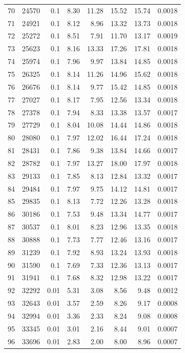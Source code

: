 \documentclass[11pt,a4paper]{article}
\begin{document}
\begin{center}
\begin{longtable}{@{}rrrrrrrr@{}}
70 & 24570 & 0.1 & 8.30 & 11.28 & 15.52 & 15.74 & 0.0018 \\
71 & 24921 & 0.1 & 8.12 & 8.96 & 13.32 & 13.73 & 0.0018 \\
72 & 25272 & 0.1 & 8.51 & 7.91 & 11.70 & 13.17 & 0.0019 \\
73 & 25623 & 0.1 & 8.16 & 13.33 & 17.26 & 17.81 & 0.0018 \\
74 & 25974 & 0.1 & 7.96 & 9.97 & 13.84 & 14.85 & 0.0018 \\
75 & 26325 & 0.1 & 8.14 & 11.26 & 14.96 & 15.62 & 0.0018 \\
76 & 26676 & 0.1 & 8.14 & 9.77 & 15.42 & 14.85 & 0.0018 \\
77 & 27027 & 0.1 & 8.17 & 7.95 & 12.56 & 13.34 & 0.0018 \\
78 & 27378 & 0.1 & 7.94 & 8.33 & 13.38 & 13.57 & 0.0017 \\
79 & 27729 & 0.1 & 8.04 & 10.08 & 14.44 & 14.86 & 0.0018 \\
80 & 28080 & 0.1 & 7.97 & 12.02 & 16.44 & 17.24 & 0.0018 \\
81 & 28431 & 0.1 & 7.86 & 9.38 & 13.84 & 14.66 & 0.0017 \\
82 & 28782 & 0.1 & 7.97 & 13.27 & 18.00 & 17.97 & 0.0018 \\
83 & 29133 & 0.1 & 7.85 & 8.13 & 12.84 & 13.32 & 0.0017 \\
84 & 29484 & 0.1 & 7.97 & 9.75 & 14.12 & 14.81 & 0.0017 \\
85 & 29835 & 0.1 & 8.13 & 7.72 & 12.26 & 13.28 & 0.0018 \\
86 & 30186 & 0.1 & 7.53 & 9.48 & 13.34 & 14.77 & 0.0017 \\
87 & 30537 & 0.1 & 8.01 & 8.23 & 12.96 & 13.35 & 0.0018 \\
88 & 30888 & 0.1 & 7.73 & 7.77 & 12.46 & 13.16 & 0.0017 \\
89 & 31239 & 0.1 & 7.92 & 8.93 & 13.24 & 13.93 & 0.0018 \\
90 & 31590 & 0.1 & 7.69 & 7.33 & 12.36 & 13.13 & 0.0017 \\
91 & 31941 & 0.1 & 7.68 & 8.32 & 12.98 & 13.22 & 0.0017 \\
92 & 32292 & 0.01 & 5.31 & 3.08 & 8.56 & 9.48 & 0.0012 \\
93 & 32643 & 0.01 & 3.57 & 2.59 & 8.26 & 9.17 & 0.0008 \\
94 & 32994 & 0.01 & 3.36 & 2.33 & 8.24 & 9.08 & 0.0008 \\
95 & 33345 & 0.01 & 3.01 & 2.16 & 8.44 & 9.01 & 0.0007 \\
96 & 33696 & 0.01 & 2.83 & 2.00 & 8.00 & 8.96 & 0.0007 \\

\end{longtable}
\end{center}
\end{document}
